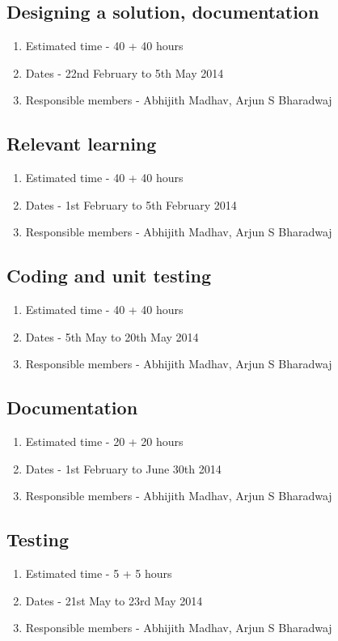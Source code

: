 \documentclass[11pt]{report} %
\begin{document}
\subsection*{Designing a solution, documentation}
\begin{enumerate}
\item Estimated time - 40 + 40 hours
\item Dates - 22nd February to 5th May 2014
\item Responsible members - Abhijith Madhav, Arjun S Bharadwaj
\end{enumerate}
\subsection*{Relevant learning}
\begin{enumerate}
\item Estimated time - 40 + 40 hours
\item Dates - 1st February to 5th February 2014
\item Responsible members - Abhijith Madhav, Arjun S Bharadwaj
\end{enumerate}
\subsection*{Coding and unit testing}
\begin{enumerate}
\item Estimated time - 40 + 40 hours
\item Dates - 5th May to 20th May 2014
\item Responsible members - Abhijith Madhav, Arjun S Bharadwaj
\end{enumerate}
\subsection*{Documentation}
\begin{enumerate}
\item Estimated time - 20 + 20 hours
\item Dates - 1st February to June 30th 2014
\item Responsible members - Abhijith Madhav, Arjun S Bharadwaj
\end{enumerate}
\subsection*{Testing}
\begin{enumerate}
\item Estimated time - 5 + 5 hours
\item Dates - 21st May to 23rd May 2014
\item Responsible members - Abhijith Madhav, Arjun S Bharadwaj
\end{enumerate}
\end{document}
